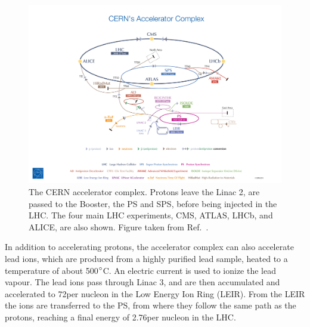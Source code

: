 \begin{figure}[htbp]
  \centering
  \includegraphics[width=\textwidth,clip=true,trim=10cm 0 13cm 9cm]
  {figures/lhc/cern_accelerator_complex_cds1621583}
  \caption{The CERN accelerator complex. Protons leave the Linac 2, are passed to the Booster, the
PS and SPS, before being injected in the LHC. The four main LHC experiments, CMS, ATLAS, LHCb, and
ALICE, are also shown. Figure taken from Ref.~\cite{lhc_complex}.
  \label{fig:lhc_complex}}
\end{figure}

In addition to accelerating protons, the accelerator complex can also accelerate lead ions, which
are produced from a highly purified lead sample, heated to a temperature of about 500$^\circ$C. An
electric current is used to ionize the lead vapour.
The lead ions pass through Linac 3, and are then accumulated and accelerated to 72\MeV per nucleon
in the Low Energy Ion Ring (LEIR). 
From the LEIR the ions are transferred to the PS, from where they follow the same path as the
protons, reaching a final energy of 2.76\TeV per nucleon in the LHC. 

